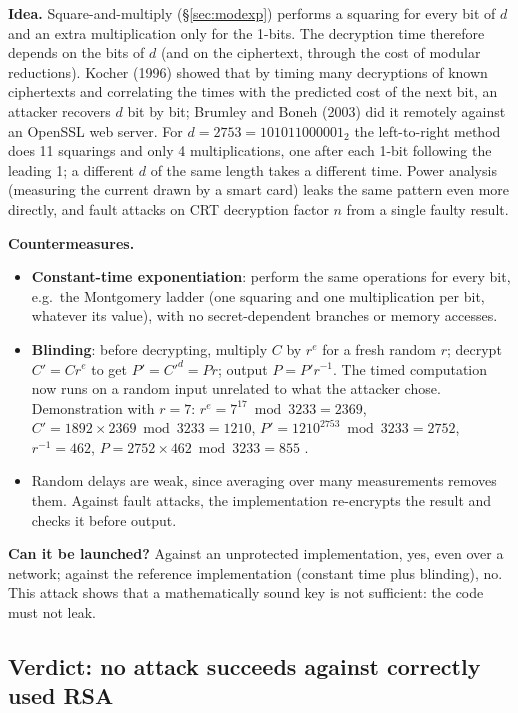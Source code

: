 \textbf{Idea.} Square-and-multiply (\S\ref{sec:modexp}) performs a squaring for every bit of $d$ and an extra multiplication only for the 1-bits. The decryption time therefore depends on the bits of $d$ (and on the ciphertext, through the cost of modular reductions). Kocher (1996) showed that by timing many decryptions of known ciphertexts and correlating the times with the predicted cost of the next bit, an attacker recovers $d$ bit by bit; Brumley and Boneh (2003) did it remotely against an OpenSSL web server. For $d = 2753 = 101011000001_2$ the left-to-right method does 11 squarings and only 4 multiplications, one after each 1-bit following the leading 1; a different $d$ of the same length takes a different time. Power analysis (measuring the current drawn by a smart card) leaks the same pattern even more directly, and fault attacks on CRT decryption factor $n$ from a single faulty result.

\textbf{Countermeasures.}
\begin{itemize}[leftmargin=1.4em]
  \item \textbf{Constant-time exponentiation}: perform the same operations for every bit, e.g.\ the Montgomery ladder (one squaring and one multiplication per bit, whatever its value), with no secret-dependent branches or memory accesses.
  \item \textbf{Blinding}: before decrypting, multiply $C$ by $r^e$ for a fresh random $r$; decrypt $C' = C r^e$ to get $P' = C'^d = P r$; output $P = P' r^{-1}$. The timed computation now runs on a random input unrelated to what the attacker chose. Demonstration with $r = 7$: $r^e = 7^{17} \bmod 3233 = 2369$, $C' = 1892 \times 2369 \bmod 3233 = 1210$, $P' = 1210^{2753} \bmod 3233 = 2752$, $r^{-1} = 462$, $P = 2752 \times 462 \bmod 3233 = 855$ \checkmark.
  \item Random delays are weak, since averaging over many measurements removes them. Against fault attacks, the implementation re-encrypts the result and checks it before output.
\end{itemize}
\textbf{Can it be launched?} Against an unprotected implementation, yes, even over a network; against the reference implementation (constant time plus blinding), no. This attack shows that a mathematically sound key is not sufficient: the code must not leak.

\subsection{Verdict: no attack succeeds against correctly used RSA \hot\new}

